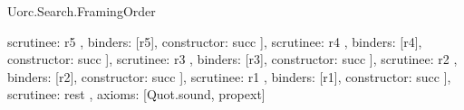 \begin{lexlean}{Uorc.Search.FramingOrder}
\begin{semanticmodule}
{{{{{{{{{{{{                                  scrutinee: r5
                                },
                                binders: [r5],
                                constructor: succ
                              }
                            ],
                            scrutinee: r4
                          },
                          binders: [r4],
                          constructor: succ
                        }
                      ],
                      scrutinee: r3
                    },
                    binders: [r3],
                    constructor: succ
                  }
                ],
                scrutinee: r2
              },
              binders: [r2],
              constructor: succ
            }
          ],
          scrutinee: r1
        },
        binders: [r1],
        constructor: succ
      }
    ],
    scrutinee: rest
  },
  axioms: [Quot.sound, propext]
}


\end{semanticmodule}
\end{lexlean}
